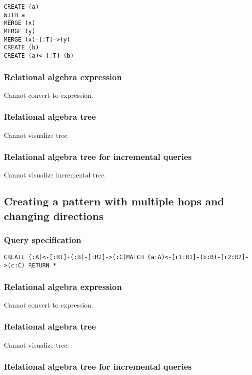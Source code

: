 \begin{lstlisting}
CREATE (a)
WITH a
MERGE (x)
MERGE (y)
MERGE (x)-[:T]->(y)
CREATE (b)
CREATE (a)<-[:T]-(b)
\end{lstlisting}

\subsubsection*{Relational algebra expression}

Cannot convert to expression.

\subsubsection*{Relational algebra tree}

Cannot visualize tree.

\subsubsection*{Relational algebra tree for incremental queries}

Cannot visualize incremental tree.

\subsection{Creating a pattern with multiple hops and changing directions}

\subsubsection*{Query specification}

\begin{lstlisting}
CREATE (:A)<-[:R1]-(:B)-[:R2]->(:C)MATCH (a:A)<-[r1:R1]-(b:B)-[r2:R2]->(c:C) RETURN *
\end{lstlisting}

\subsubsection*{Relational algebra expression}

Cannot convert to expression.

\subsubsection*{Relational algebra tree}

Cannot visualize tree.

\subsubsection*{Relational algebra tree for incremental queries}

